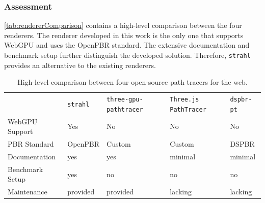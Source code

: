 \subsubsection*{Assessment}

\autoref{tab:rendererComparison} contains a high-level comparison between the four renderers. The renderer developed in this work is the only one that supports \gls{WebGPU} and uses the \gls{OpenPBR} standard. The extensive documentation and benchmark setup further distinguish the developed solution. Therefore, \texttt{strahl} provides an alternative to the existing renderers.

\begin{table}[H]
  \centering
  \begin{tabular}{@{}p{3cm}p{1.9cm}p{2.8cm}p{3.2cm}p{2.0cm}@{}}
    \toprule
                                  & \texttt{strahl} & \texttt{three-gpu-} \texttt{pathtracer} \cite{ThreeJsPathTracerJohnson} & \texttt{Three.js PathTracer} \cite{ThreeJsPathTracerLoftis} & \texttt{dspbr-pt} \cite{PathTracerDassault} \\
    \gls{WebGPU} \newline Support & Yes             & No                                                                      & No                                                          & No                                          \\
    \gls{PBR} Standard            & \gls{OpenPBR}   & Custom                                                                  & Custom                                                      & \gls{DSPBR}                                 \\
    Documentation                 & yes             & yes                                                                     & minimal                                                     & minimal                                     \\
    Benchmark Setup               & yes             & no                                                                      & no                                                          & no                                          \\
    Maintenance                   & provided        & provided                                                                & lacking                                                     & lacking                                     \\
    \bottomrule
  \end{tabular}
  \caption{High-level comparison between four open-source path tracers for the web.}
  \label{tab:rendererComparison}
\end{table}

